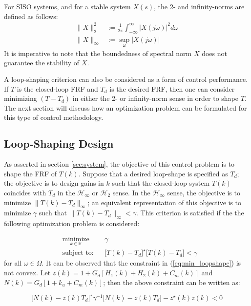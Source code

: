 \documentclass[a4paper, 10pt, conference]{ieeeconf}
\begin{document}
For SISO systems, and for a stable system $X(s)$, the 2- and infinity-norms are defined as follows:
\begin{align*}
\| X\|_2^2 & := \frac{1}{2\pi} \int_{- \infty}^\infty |X(j\omega)|^2 d\omega \\
\| X\|_\infty & :=  \sup_{\omega} |X(j\omega)|
\end{align*}
It is imperative to note that the boundedness of spectral norm $X$ does not guarantee the stability of $X$. 

A loop-shaping criterion can also be considered as a form of control performance. If $T$ is the closed-loop FRF and $T_d$ is the desired FRF, then one can consider minimizing $(T-T_d)$ in either the 2- or infinity-norm sense in order to shape $T$.  The next section will discuss how an optimization problem can be formulated for this type of control methodology.

\subsection{Loop-Shaping Design}
\label{sec:loop_shape}
As asserted in section \ref{sec:system}, the objective of this control problem is to shape the FRF of $T(k)$. Suppose that a desired loop-shape is specified as $T_d$; the objective is to design gains in $k$ such that the closed-loop system $T(k)$ coincides with $T_d$ in the $\mathcal{H}_\infty$ or $\mathcal{H}_2$ sense. In the $\mathcal{H}_\infty$ sense, the objective is to minimize $ \|T(k) - T_d \|_\infty$; an equivalent representation of this objective is to minimize $\gamma$ such that $ \|T(k) - T_d \|_\infty < \gamma$. This criterion is satisfied if the the following optimization problem is considered:
 
 \begin{equation} \label{eq:min_loopshape}
\begin{aligned}
& \underset{ k \in \mathbb{R}}{\text{minimize}}
& & \gamma  \\
& \text{subject to:} & & \bigl[T(k)-T_d\bigr]^{\star}\bigl[T(k)-T_d\bigr] < \gamma
\end{aligned}
\end{equation}
for all $\omega \in \Omega$. It can be observed that the constraint in (\ref{eq:min_loopshape}) is not convex. Let $z(k) = 1+G_d[H_1(k)+H_2(k)+C_m(k)]$ and $N(k) = G_d[1+k_u+C_m(k)]$; then the above constraint can be written as:

\begin{equation}
\bigl[N(k)-z(k)T_d \bigr]^{\star}\gamma^{-1} \bigl[N(k)-z(k)T_d \bigr] - z^{\star}(k)z(k)<0
\end{equation} 
\end{document}
